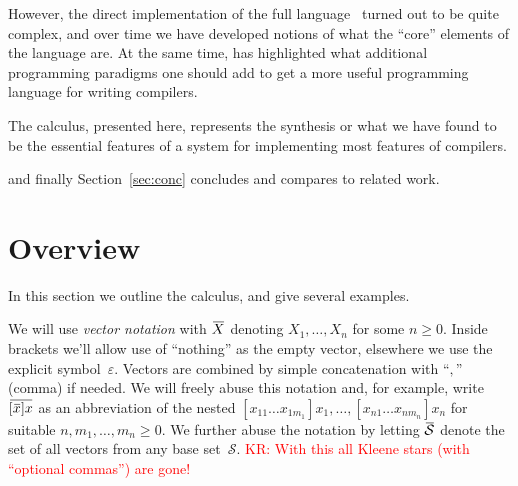 \documentclass[letterpaper,11pt]{article}
\newcommand{\KR}[1]{\textcolor{red}{KR: #1}}
\begin{document}
However, the direct implementation of the full \CRSX language~\cite{crsx} turned out to be quite
complex, and over time we have developed notions of what the ``core'' elements of the language
are. At the same time, \HAX has highlighted what additional programming paradigms one should add to
get a more useful programming language for writing compilers.


The \hax calculus, presented here, represents the synthesis or what we have found to be the
essential features of a system for implementing most features of compilers.

%
and finally Section~\ref{sec:conc} concludes and compares to related work.


\section{Overview}
\label{sec:overview}

In this section we outline the \hax calculus, and give several examples.

\begin{notation}[vectors]
  We will use \emph{vector notation} with $\ov{X}$ denoting $X_1,…,X_n$ for some $n≥0$. Inside
  brackets we'll allow use of ``nothing'' as the empty vector, elsewhere we use the explicit
  symbol~$ε$.  Vectors are combined by simple concatenation with ``$,$'' (comma) if needed. We will
  freely abuse this notation and, for example, write $\ov{[\ov{x}]x}$ as an abbreviation of the nested
  $[x_{11}…x_{1m_1}]x_1,…,[x_{n1}…x_{nm_n}]x_n$ for suitable $n,m_1,…,m_n ≥ 0$. We further abuse the
  notation by letting $\ov{\mathcal{S}}$ denote the set of all vectors from any base
  set~$\mathcal{S}$.
  \KR{With this all Kleene stars (with ``optional commas'') are gone!}
\end{notation}
\end{document}
